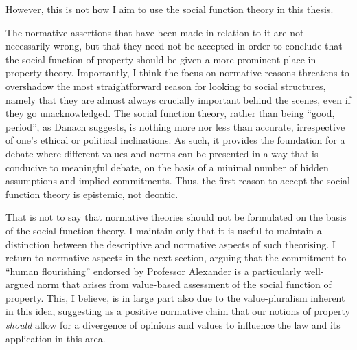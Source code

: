 However, this is not how I aim to use the  social function theory in this thesis. 

The normative assertions that have been made in relation to it are not necessarily wrong, but that they need not be accepted in order to conclude that the social function of property should be given a more prominent place in property theory. Importantly, I think the focus on normative reasons threatens to overshadow the most straightforward reason for looking to social structures, namely that they are almost always crucially important behind the scenes, even if they go unacknowledged. The social function theory, rather than being ``good, period'', as Danach suggests, is nothing more nor less than accurate, irrespective of one's ethical or political inclinations. As such, it provides the foundation for a debate where different values and norms can be presented in a way that is conducive to meaningful debate, on the basis of a minimal number of hidden assumptions and implied commitments. Thus, the first reason to accept the social function theory is epistemic, not deontic.

That is not to say that normative theories should not be formulated on the basis of the social function theory. I maintain only that  it is useful to maintain a distinction  between the descriptive and normative aspects of such theorising. I return to normative aspects in the next section, arguing that the commitment to ``human flourishing'' endorsed by Professor Alexander is a particularly well-argued norm that arises from value-based assessment of the social function of property. This, I believe, is in large part also due to the value-pluralism inherent in this idea, suggesting as a positive normative claim that our notions of property {\it should} allow for a divergence of opinions and values to influence the law and its application in this area.

